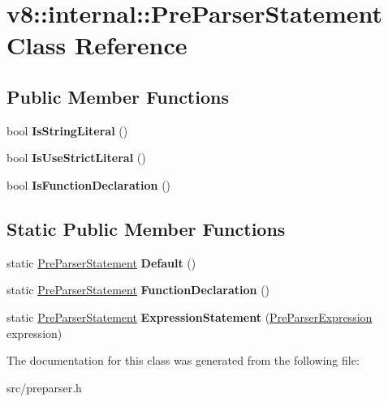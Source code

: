 \hypertarget{classv8_1_1internal_1_1_pre_parser_statement}{}\section{v8\+:\+:internal\+:\+:Pre\+Parser\+Statement Class Reference}
\label{classv8_1_1internal_1_1_pre_parser_statement}
\subsection*{Public Member Functions}
\begin{DoxyCompactItemize}
\item 
\hypertarget{classv8_1_1internal_1_1_pre_parser_statement_aab47f7768a864f9c66b066961e2b717c}{}bool {\bfseries Is\+String\+Literal} ()\label{classv8_1_1internal_1_1_pre_parser_statement_aab47f7768a864f9c66b066961e2b717c}

\item 
\hypertarget{classv8_1_1internal_1_1_pre_parser_statement_a52e9507f12f73977e84da55931555f6b}{}bool {\bfseries Is\+Use\+Strict\+Literal} ()\label{classv8_1_1internal_1_1_pre_parser_statement_a52e9507f12f73977e84da55931555f6b}

\item 
\hypertarget{classv8_1_1internal_1_1_pre_parser_statement_afd51921090db14ae6ac42855554d6917}{}bool {\bfseries Is\+Function\+Declaration} ()\label{classv8_1_1internal_1_1_pre_parser_statement_afd51921090db14ae6ac42855554d6917}

\end{DoxyCompactItemize}
\subsection*{Static Public Member Functions}
\begin{DoxyCompactItemize}
\item 
\hypertarget{classv8_1_1internal_1_1_pre_parser_statement_a932e6f366056841f205219195c215da3}{}static \hyperlink{classv8_1_1internal_1_1_pre_parser_statement}{Pre\+Parser\+Statement} {\bfseries Default} ()\label{classv8_1_1internal_1_1_pre_parser_statement_a932e6f366056841f205219195c215da3}

\item 
\hypertarget{classv8_1_1internal_1_1_pre_parser_statement_a5c6f48c997864cabdd64cf09d067b8eb}{}static \hyperlink{classv8_1_1internal_1_1_pre_parser_statement}{Pre\+Parser\+Statement} {\bfseries Function\+Declaration} ()\label{classv8_1_1internal_1_1_pre_parser_statement_a5c6f48c997864cabdd64cf09d067b8eb}

\item 
\hypertarget{classv8_1_1internal_1_1_pre_parser_statement_aa36e1a3ac10bac08b27767bae6bb44e9}{}static \hyperlink{classv8_1_1internal_1_1_pre_parser_statement}{Pre\+Parser\+Statement} {\bfseries Expression\+Statement} (\hyperlink{classv8_1_1internal_1_1_pre_parser_expression}{Pre\+Parser\+Expression} expression)\label{classv8_1_1internal_1_1_pre_parser_statement_aa36e1a3ac10bac08b27767bae6bb44e9}

\end{DoxyCompactItemize}


The documentation for this class was generated from the following file\+:\begin{DoxyCompactItemize}
\item 
src/preparser.\+h\end{DoxyCompactItemize}
